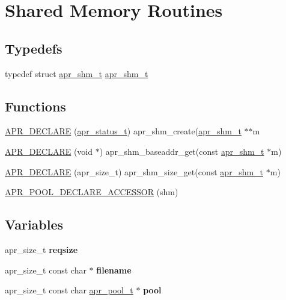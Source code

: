 \hypertarget{group__apr__shm}{}\section{Shared Memory Routines}
\label{group__apr__shm}
\subsection*{Typedefs}
\begin{DoxyCompactItemize}
\item 
typedef struct \mbox{\hyperlink{structapr__shm__t}{apr\+\_\+shm\+\_\+t}} \mbox{\hyperlink{group__apr__shm_ga79e8c16bdeaf7ade4ef0f935249e7c2f}{apr\+\_\+shm\+\_\+t}}
\end{DoxyCompactItemize}
\subsection*{Functions}
\begin{DoxyCompactItemize}
\item 
\mbox{\hyperlink{group__apr__shm_ga9556068323f037a43a12d5a786531bfe}{A\+P\+R\+\_\+\+D\+E\+C\+L\+A\+RE}} (\mbox{\hyperlink{group__apr__errno_gaf76ee4543247e9fb3f3546203e590a6c}{apr\+\_\+status\+\_\+t}}) apr\+\_\+shm\+\_\+create(\mbox{\hyperlink{structapr__shm__t}{apr\+\_\+shm\+\_\+t}} $\ast$$\ast$m
\item 
\mbox{\hyperlink{group__apr__shm_ga4a32d22bb2597ba484dbfe0668e60caa}{A\+P\+R\+\_\+\+D\+E\+C\+L\+A\+RE}} (void $\ast$) apr\+\_\+shm\+\_\+baseaddr\+\_\+get(const \mbox{\hyperlink{structapr__shm__t}{apr\+\_\+shm\+\_\+t}} $\ast$m)
\item 
\mbox{\hyperlink{group__apr__shm_ga916236d26c53ae751c5e56e5ae9f3b09}{A\+P\+R\+\_\+\+D\+E\+C\+L\+A\+RE}} (apr\+\_\+size\+\_\+t) apr\+\_\+shm\+\_\+size\+\_\+get(const \mbox{\hyperlink{structapr__shm__t}{apr\+\_\+shm\+\_\+t}} $\ast$m)
\item 
\mbox{\hyperlink{group__apr__shm_ga2f33ef81c957af596afa3417a4748d3e}{A\+P\+R\+\_\+\+P\+O\+O\+L\+\_\+\+D\+E\+C\+L\+A\+R\+E\+\_\+\+A\+C\+C\+E\+S\+S\+OR}} (shm)
\end{DoxyCompactItemize}
\subsection*{Variables}
\begin{DoxyCompactItemize}
\item 
\mbox{\label{group__apr__shm_gab0526251505fe7f4db6377b7617e16d9}} 
apr\+\_\+size\+\_\+t {\bfseries reqsize}
\item 
\mbox{\label{group__apr__shm_ga28849770c8bfeb04039d7dd29d4dfa35}} 
apr\+\_\+size\+\_\+t const char $\ast$ {\bfseries filename}
\item 
\mbox{\label{group__apr__shm_ga51fbc0d90e2519e2e42e03c5dd9f441b}} 
apr\+\_\+size\+\_\+t const char \mbox{\hyperlink{group__apr__pools_gaf137f28edcf9a086cd6bc36c20d7cdfb}{apr\+\_\+pool\+\_\+t}} $\ast$ {\bfseries pool}
\end{DoxyCompactItemize}


